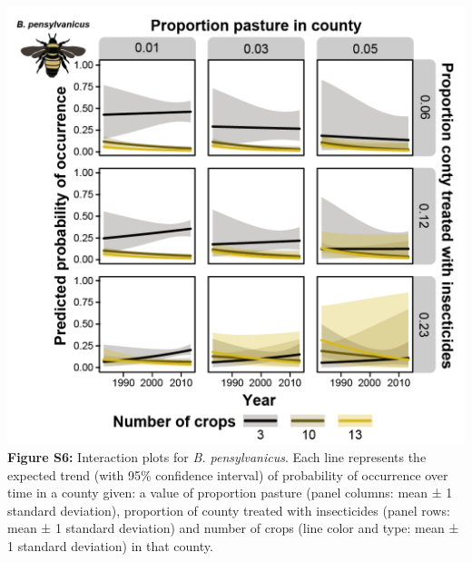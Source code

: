 \documentclass[11pt,]{article}
\begin{document}
\newpage

\includegraphics[width=1\textwidth,height=\textheight]{../ms_figs/fig_s6.png}
\textbf{Figure S6:} Interaction plots for \emph{B. pensylvanicus}. Each
line represents the expected trend (with 95\% confidence interval) of
probability of occurrence over time in a county given: a value of
proportion pasture (panel columns: mean ± 1 standard deviation),
proportion of county treated with insecticides (panel rows: mean ± 1
standard deviation) and number of crops (line color and type: mean ± 1
standard deviation) in that county. \clearpage

\newpage
\end{document}
